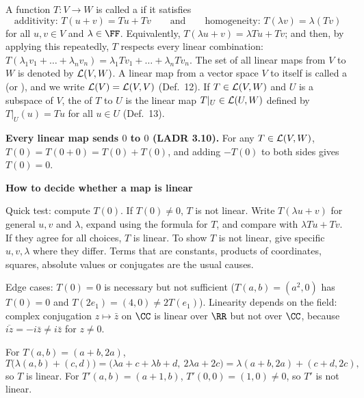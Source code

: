 \documentclass[10pt]{scrartcl}
\newenvironment{methodbox}[1]{\begin{mdframed}[style=methodstyle]\textbf{\color{NavyBlue}#1}\par\vspace{2pt}}{\end{mdframed}}
\begin{document}
\begin{definition*}
  \begin{itemize}
    \ii A function $T\colon V\to W$ is called a  if it satisfies
    \[
      \text{additivity: } T(u+v) = Tu + Tv \qquad\text{and}\qquad \text{homogeneity: } T(\lambda v) = \lambda(Tv)
    \]
    for all $u,v\in V$ and $\lambda\in\FF$. Equivalently, $T(\lambda u+v)=\lambda Tu+Tv$; and then, by applying this repeatedly, $T$ respects every linear combination: $T(\lambda_1v_1+\dots+\lambda_nv_n)=\lambda_1Tv_1+\dots+\lambda_nTv_n$.
    \ii The set of all linear maps from $V$ to $W$ is denoted by $\mathcal L(V,W)$. A linear map from a vector space $V$ to itself is called a  (or ), and we write $\mathcal L(V)=\mathcal L(V,V)$ (Def.~12).
    \ii If $T\in\mathcal L(V,W)$ and $U$ is a subspace of $V$, the  of $T$ to $U$ is the linear map $T|_U\in\mathcal L(U,W)$ defined by $T|_U(u)=Tu$ for all $u\in U$ (Def.~13).
  \end{itemize}
\end{definition*}

\textbf{Every linear map sends $0$ to $0$ (LADR 3.10).} For any $T\in\mathcal L(V,W)$, $T(0)=T(0+0)=T(0)+T(0)$, and adding $-T(0)$ to both sides gives $T(0)=0$.

\begin{methodbox}{How to decide whether a map is linear}
  \begin{steps}
    \ii Quick test: compute $T(0)$. If $T(0)\ne0$, $T$ is not linear.
    \ii Write $T(\lambda u+v)$ for general $u,v$ and $\lambda$, expand using the formula for $T$, and compare with $\lambda Tu+Tv$. If they agree for all choices, $T$ is linear.
    \ii To show $T$ is not linear, give specific $u,v,\lambda$ where they differ. Terms that are constants, products of coordinates, squares, absolute values or conjugates are the usual causes.
  \end{steps}
  Edge cases: $T(0)=0$ is necessary but not sufficient ($T(a,b)=(a^2,0)$ has $T(0)=0$ and $T(2e_1)=(4,0)\ne2T(e_1)$). Linearity depends on the field: complex conjugation $z\mapsto\bar z$ on $\CC$ is linear over $\RR$ but not over $\CC$, because $\overline{iz}=-i\bar z\ne i\bar z$ for $z\ne0$.
\end{methodbox}

\begin{example*}
  For $T(a,b)=(a+b,2a)$,
  \[
    T\bigl(\lambda(a,b)+(c,d)\bigr)=\bigl(\lambda a+c+\lambda b+d,\ 2\lambda a+2c\bigr)=\lambda(a+b,2a)+(c+d,2c),
  \]
  so $T$ is linear. For $T'(a,b)=(a+1,b)$, $T'(0,0)=(1,0)\ne0$, so $T'$ is not linear.
\end{example*}
\end{document}
